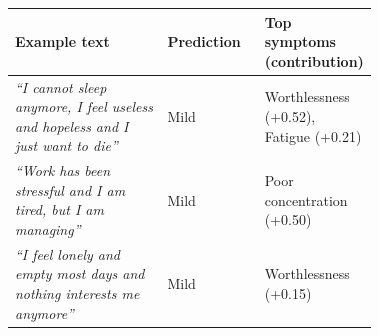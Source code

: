 \begin{tabular}{p{0.42\linewidth}lp{0.3\linewidth}}
\toprule
Example text & Prediction & Top symptoms (contribution) \\
\midrule
\textit{``I cannot sleep anymore, I feel useless and hopeless and I just want to die''} & Mild & Worthlessness (+0.52), Fatigue (+0.21) \\
\textit{``Work has been stressful and I am tired, but I am managing''} & Mild & Poor concentration (+0.50) \\
\textit{``I feel lonely and empty most days and nothing interests me anymore''} & Mild & Worthlessness (+0.15) \\
\bottomrule
\end{tabular}%
